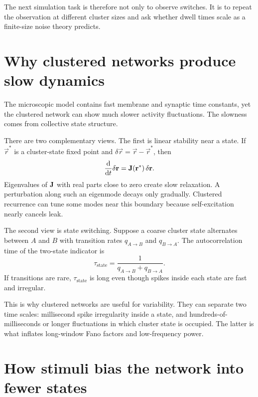 The next simulation task is therefore not only to observe switches. It is to repeat the observation at different cluster sizes and ask whether dwell times scale as a finite-size noise theory predicts.

\section{Why clustered networks produce slow dynamics}
\label{sec:why-clustered-networks-produce-slow-dynamics}

The microscopic model contains fast membrane and synaptic time constants, yet the clustered network can show much slower activity fluctuations. The slowness comes from collective state structure.

There are two complementary views. The first is linear stability near a state. If $\vec r^*$ is a cluster-state fixed point and $\delta\vec r=\vec r-\vec r^*$, then
%
\begin{equation}
  \frac{\mathop{}\!\mathrm{d}}{\mathop{}\!\mathrm{d} t}\delta\mathbf{r}
  =
  \mathbf{J}(\mathbf{r}^*)\,\delta\mathbf{r} .
  \label{eq:cluster-linearization}
\end{equation}
%
Eigenvalues of $\mathbf{J}$ with real parts close to zero create slow relaxation. A perturbation along such an eigenmode decays only gradually. Clustered recurrence can tune some modes near this boundary because self-excitation nearly cancels leak.

The second view is state switching. Suppose a coarse cluster state alternates between $A$ and $B$ with transition rates $q_{A\to B}$ and $q_{B\to A}$. The autocorrelation time of the two-state indicator is
%
\begin{equation}
  \tau_{\mathrm{state}}
  =
  \frac{1}{q_{A\to B}+q_{B\to A}}.
  \label{eq:two-state-autocorrelation-time}
\end{equation}
%
If transitions are rare, $\tau_{\mathrm{state}}$ is long even though spikes inside each state are fast and irregular.

This is why clustered networks are useful for variability. They can separate two time scales: millisecond spike irregularity inside a state, and hundreds-of-milliseconds or longer fluctuations in which cluster state is occupied. The latter is what inflates long-window Fano factors and low-frequency power.

\section{How stimuli bias the network into fewer states}
\label{sec:stimuli-bias-network-fewer-states}

